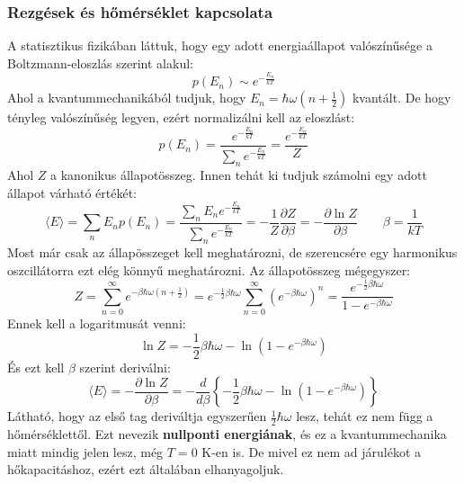 \documentclass[../main.tex]{subfiles}
\begin{document}
\subsubsection{Rezgések és hőmérséklet kapcsolata}
A statisztikus fizikában láttuk, hogy egy adott energiaállapot valószínűsége a Boltzmann-eloszlás szerint alakul:
\begin{equation}
    p(E_n) \sim e^{-\frac{E_n}{k T}}
\end{equation}
Ahol a kvantummechanikából tudjuk, hogy $E_n = \hbar \omega (n + \frac{1}{2})$ kvantált. De hogy tényleg valószínűség legyen, ezért normalizálni kell az eloszlást:
\begin{equation}
    p(E_n) = \frac{e^{-\frac{E_n}{k T}}}{\sum_n e^{-\frac{E_n}{k T}}} = \frac{e^{-\frac{E_n}{k T}}}{Z}
\end{equation}
Ahol $Z$ a kanonikus állapotösszeg. Innen tehát ki tudjuk számolni egy adott állapot várható értékét:
\begin{equation}
    \langle E \rangle = \sum_n E_n p(E_n) = \frac{\sum_n E_n e^{-\frac{E_n}{k T}}}{\sum_n e^{-\frac{E_n}{k T}}} = - \frac{1}{Z} \frac{\partial Z}{\partial \beta} = - \frac{\partial \ln Z}{\partial \beta} \qquad \beta = \frac{1}{k T}
\end{equation}
Most már csak az állapösszeget kell meghatározni, de szerencsére egy harmonikus oszcillátorra ezt elég könnyű meghatározni. Az állapotösszeg mégegyszer:
\begin{equation}
    Z = \sum_{n = 0}^{\infty} e^{-\beta \hbar \omega (n + \frac{1}{2})} = e^{-\frac{1}{2} \beta \hbar \omega} \sum_{n=0}^{\infty} \left(e^{-\beta \hbar \omega}\right)^n = \frac{e^{-\frac{1}{2} \beta \hbar \omega}}{1 - e^{-\beta \hbar \omega}}
\end{equation}
Ennek kell a logaritmusát venni:
\begin{equation}
    \ln Z = -\frac{1}{2} \beta \hbar \omega - \ln \left(1 - e^{-\beta \hbar \omega}\right)
\end{equation}
És ezt kell $\beta$ szerint deriválni:
\begin{equation}
    \langle E \rangle = -\frac{\partial \ln Z}{\partial \beta} = -\frac{d}{d \beta} \left\{ -\frac{1}{2} \beta \hbar \omega - \ln \left(1 - e^{-\beta \hbar \omega}\right) \right\}
\end{equation}
Látható, hogy az első tag deriváltja egyszerűen $\frac{1}{2} \hbar \omega$ lesz, tehát ez nem függ a hőmérséklettől. Ezt nevezik \textbf{nullponti energiának}, és ez a kvantummechanika miatt mindig jelen lesz, még $T=0$ K-en is. De mivel ez nem ad járulékot a hőkapacitáshoz, ezért ezt általában elhanyagoljuk.
\end{document}
